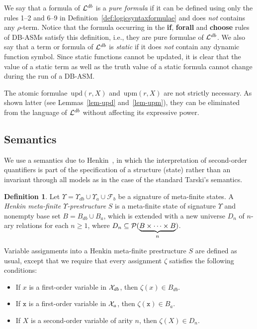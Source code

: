 \documentclass[preprint,11pt]{elsarticle}
\theoremstyle{definition}
\newtheorem{definition}{Definition}[section]
\theoremstyle{remark}
\begin{document}
We say that a formula of ${\cal L}^{db}$ is a \emph{pure formula} if it can be defined using only the rules 1--2 and 6--9 in Definition~\ref{def:logicsyntaxformulae} and does \emph{not} contains any $\rho$-term. Notice that the formula occurring in the \textbf{if}, \textbf{forall} and \textbf{choose} rules of DB-ASMs satisfy this definition, i.e., they are pure formulae of ${\cal L}^{db}$. We also say that a term or formula of ${\cal L}^{db}$ is \emph{static} if it does \emph{not} contain any dynamic function symbol. Since static functions cannot be updated,  it is clear that the value of a static term as well as the truth value of a static formula cannot change during the run of a DB-ASM. 

The atomic formulae~$\textrm{upd}(r, X)$ and~$\textrm{upm}(r,X)$ are not strictly necessary. As shown latter (see Lemmas~\ref{lem-upd} and~\ref{lem-upm}), they can be eliminated from the language of ${\cal L}^{db}$ without affecting its expressive power.   


\subsection{Semantics}\label{subsec-adtmlogic-semantics}

We use a semantics due to Henkin~\cite{henkin1950}, in which the interpretation of second-order quantifiers is part of the specification of a structure (state) rather than an invariant through all models as in the case of the standard Tarski's semantics. 

\begin{definition}\label{HenkinPreStructure}
Let $\Upsilon=\Upsilon_{db}\cup\Upsilon_a\cup\mathcal{F}_b$ be a signature of meta-finite states. A \emph{Henkin meta-finite $\Upsilon$-prestructure} $S$ is a meta-finite state of signature $\Upsilon$ and nonempty base set $B = B_{db} \cup B_a$, which is extended with a new universe $D_n$ of $n$-ary relations for each $n \geq 1$, where $D_n \subseteq {\cal P}(\underbrace{B \times \cdots \times B}_{n})$.  
\end{definition} 

Variable assignments into a Henkin meta-finite prestructure $S$ are defined as usual, except that we require that every assignment $\zeta$ satisfies the following conditions:
\begin{itemize}
\item If $x$ is a first-order variable in ${\cal X}_{db}$, then $\zeta(x) \in B_{db}$.
\item If $\mathtt{x}$ is a first-order variable in ${\cal X}_a$, then $\zeta(\mathtt{x}) \in B_a$.
\item If $X$ is a second-order variable of arity $n$, then $\zeta(X) \in D_n$.
\end{itemize}  
\end{document}
